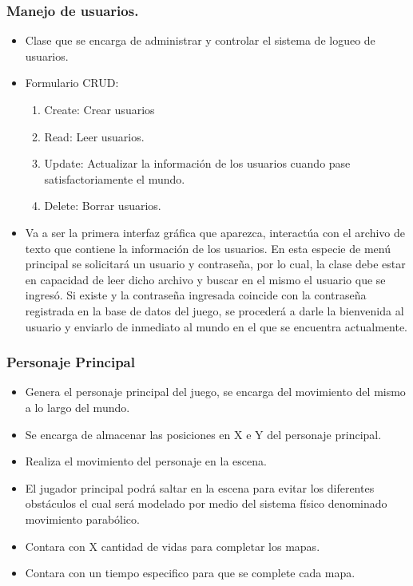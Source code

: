 \documentclass{article}
\begin{document}
\subsubsection{Manejo de usuarios.}
\begin{itemize}
    \item Clase que se encarga de administrar y controlar el sistema de logueo de usuarios.
    \item Formulario CRUD:
    \begin{enumerate}
        \item Create: Crear usuarios
        \item Read: Leer usuarios.
        \item Update: Actualizar la información  de los usuarios cuando pase satisfactoriamente el mundo.
        \item Delete: Borrar usuarios.
    \end{enumerate}
    \item Va a ser la primera interfaz gráfica que aparezca, interactúa con el archivo de texto que contiene la información de los usuarios. En esta especie de menú principal se solicitará un usuario y contraseña, por lo cual, la clase debe estar en capacidad de leer dicho archivo y buscar en el mismo el usuario que se ingresó. Si existe y la contraseña ingresada coincide con la contraseña registrada en la base de datos del juego, se procederá a darle la bienvenida al usuario y enviarlo de inmediato al mundo en el que se encuentra actualmente. 
\end{itemize}

\subsubsection{Personaje Principal}
\begin{itemize}
    \item Genera el personaje principal del juego, se encarga del movimiento del mismo a lo largo del mundo.
    \item Se encarga de almacenar las posiciones en X e Y del personaje principal.
    \item Realiza el movimiento del personaje en la escena.
    \item El jugador principal podrá saltar en la escena para evitar los diferentes obstáculos el cual será modelado por medio del sistema físico denominado  movimiento parabólico.
    \item Contara con X cantidad de vidas para completar los mapas.
    \item Contara con un tiempo especifico para que se complete cada mapa.
\end{itemize}
\end{document}
